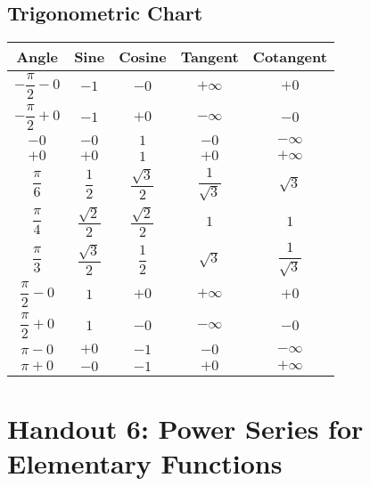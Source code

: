 \subsection{Trigonometric Chart}
\begingroup
\linespread{2}\selectfont  %

\begin{table*}[h!]
\centering
\begin{tabular}{|c|c|c|c|c|}
\hline
\textbf{Angle} & \textbf{Sine} & \textbf{Cosine} & \textbf{Tangent} & \textbf{Cotangent} \\
\hline
$-\dfrac{\pi}{2} - 0$ & $-1$ & $-0$ & $+\infty$ & $+0$ \\
$-\dfrac{\pi}{2} + 0$ & $-1$ & $+0$ & $-\infty$ & $-0$ \\
$-0$ & $-0$ & $1$ & $-0$ & $-\infty$ \\
$+0$ & $+0$ & $1$ & $+0$ & $+\infty$ \\
$\dfrac{\pi}{6}$ & $\dfrac{1}{2}$ & $\dfrac{\sqrt{3}}{2}$ & $\dfrac{1}{\sqrt{3}}$ & $\sqrt{3}$ \\
$\dfrac{\pi}{4}$ & $\dfrac{\sqrt{2}}{2}$ & $\dfrac{\sqrt{2}}{2}$ & $1$ & $1$ \\
$\dfrac{\pi}{3}$ & $\dfrac{\sqrt{3}}{2}$ & $\dfrac{1}{2}$ & $\sqrt{3}$ & $\dfrac{1}{\sqrt{3}}$ \\
$\dfrac{\pi}{2} - 0$ & $1$ & $+0$ & $+\infty$ & $+0$ \\
$\dfrac{\pi}{2} + 0$ & $1$ & $-0$ & $-\infty$ & $-0$ \\
$\pi - 0$ & $+0$ & $-1$ & $-0$ & $-\infty$ \\
$\pi + 0$ & $-0$ & $-1$ & $+0$ & $+\infty$ \\
\hline
\end{tabular}
\end{table*}

\pagebreak
\section{Handout 6: Power Series for Elementary Functions}

